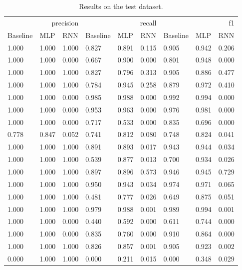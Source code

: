 \begin{table}
\caption{Results on the test dataset.}
\label{tab::ex_2_test}
\begin{tabular}{|l||l||l||l||l||l||l||l||l|}
\toprule
\multicolumn{3}{r}{precision} & \multicolumn{3}{r}{recall} & \multicolumn{3}{r}{f1} \\
Baseline & MLP & RNN & Baseline & MLP & RNN & Baseline & MLP & RNN \\
\midrule
1.000 & 1.000 & 1.000 & 0.827 & 0.891 & 0.115 & 0.905 & 0.942 & 0.206 \\
1.000 & 1.000 & 0.000 & 0.667 & 0.900 & 0.000 & 0.801 & 0.948 & 0.000 \\
1.000 & 1.000 & 1.000 & 0.827 & 0.796 & 0.313 & 0.905 & 0.886 & 0.477 \\
1.000 & 1.000 & 1.000 & 0.784 & 0.945 & 0.258 & 0.879 & 0.972 & 0.410 \\
1.000 & 1.000 & 0.000 & 0.985 & 0.988 & 0.000 & 0.992 & 0.994 & 0.000 \\
1.000 & 1.000 & 0.000 & 0.953 & 0.963 & 0.000 & 0.976 & 0.981 & 0.000 \\
1.000 & 1.000 & 0.000 & 0.717 & 0.533 & 0.000 & 0.835 & 0.696 & 0.000 \\
0.778 & 0.847 & 0.052 & 0.741 & 0.812 & 0.080 & 0.748 & 0.824 & 0.041 \\
1.000 & 1.000 & 1.000 & 0.891 & 0.893 & 0.017 & 0.943 & 0.944 & 0.034 \\
1.000 & 1.000 & 1.000 & 0.539 & 0.877 & 0.013 & 0.700 & 0.934 & 0.026 \\
1.000 & 1.000 & 1.000 & 0.897 & 0.896 & 0.573 & 0.946 & 0.945 & 0.729 \\
1.000 & 1.000 & 1.000 & 0.950 & 0.943 & 0.034 & 0.974 & 0.971 & 0.065 \\
1.000 & 1.000 & 1.000 & 0.481 & 0.777 & 0.026 & 0.649 & 0.875 & 0.051 \\
1.000 & 1.000 & 1.000 & 0.979 & 0.988 & 0.001 & 0.989 & 0.994 & 0.001 \\
1.000 & 1.000 & 0.000 & 0.440 & 0.592 & 0.000 & 0.611 & 0.744 & 0.000 \\
1.000 & 1.000 & 0.000 & 0.835 & 0.760 & 0.000 & 0.910 & 0.864 & 0.000 \\
1.000 & 1.000 & 1.000 & 0.826 & 0.857 & 0.001 & 0.905 & 0.923 & 0.002 \\
0.000 & 1.000 & 1.000 & 0.000 & 0.211 & 0.015 & 0.000 & 0.348 & 0.029 \\
\bottomrule
\end{tabular}
\end{table}
